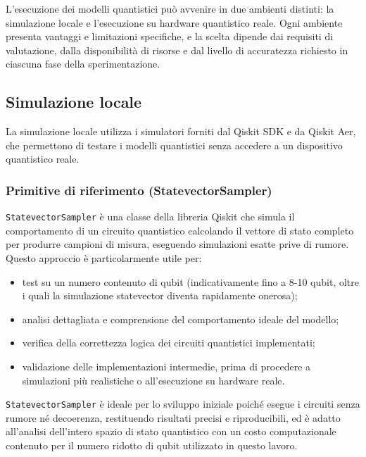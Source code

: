 L'esecuzione dei modelli quantistici può avvenire in due ambienti distinti: la simulazione locale e l'esecuzione su hardware quantistico reale. Ogni ambiente presenta vantaggi e limitazioni specifiche, e la scelta dipende dai requisiti di valutazione, dalla disponibilità di risorse e dal livello di accuratezza richiesto in ciascuna fase della sperimentazione.

\subsection{Simulazione locale}

La simulazione locale utilizza i simulatori forniti dal Qiskit SDK e da Qiskit Aer, che permettono di testare i modelli quantistici senza accedere a un dispositivo quantistico reale.

\subsubsection{Primitive di riferimento (StatevectorSampler)}
\texttt{StatevectorSampler} è una classe della libreria Qiskit che simula il comportamento di un circuito quantistico calcolando il vettore di stato completo per produrre campioni di misura, eseguendo simulazioni esatte prive di rumore. Questo approccio è particolarmente utile per:
\begin{itemize}
    \item test su un numero contenuto di qubit (indicativamente fino a 8-10 qubit, oltre i quali la simulazione statevector diventa rapidamente onerosa);
    \item analisi dettagliata e comprensione del comportamento ideale del modello;
    \item verifica della correttezza logica dei circuiti quantistici implementati;
    \item validazione delle implementazioni intermedie, prima di procedere a simulazioni più realistiche o all'esecuzione su hardware reale.
\end{itemize}

\texttt{StatevectorSampler} è ideale per lo sviluppo iniziale poiché esegue i circuiti senza rumore né decoerenza, restituendo risultati precisi e riproducibili, ed è adatto all'analisi dell'intero spazio di stato quantistico con un costo computazionale contenuto per il numero ridotto di qubit utilizzato in questo lavoro.

